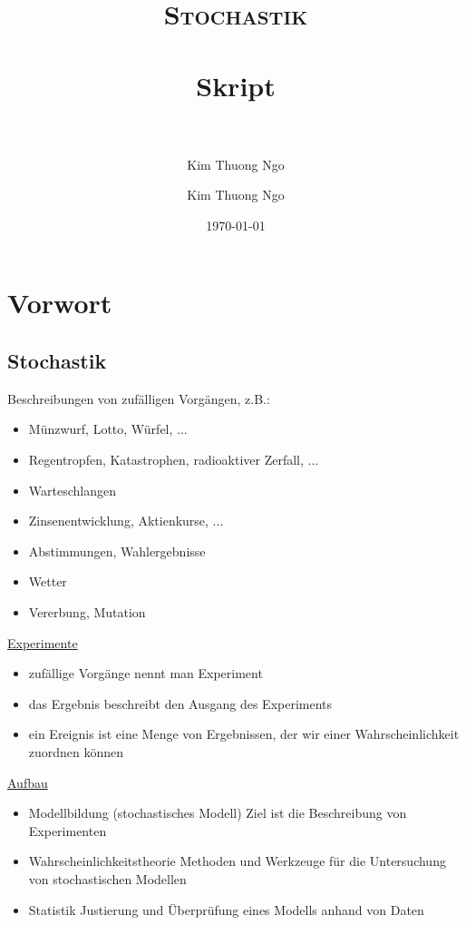 \documentclass[paper=a4, fontsize=11pt]{scrartcl}
\author{Kim Thuong Ngo}
\title{	
\normalfont \normalsize 
\textsc{Stochastik} \\ [25pt] 
\horrule{0.5pt} \\[0.4cm] 
\huge Skript \\ 
\horrule{2pt} \\[0.5cm] 
}
\author{Kim Thuong Ngo}
\date{\normalsize\today}
\numberwithin{equation}{section}
\numberwithin{figure}{section}
\numberwithin{table}{section}
\begin{document}
\maketitle 

\newpage

\tableofcontents

\newpage


\section{Vorwort}

\subsection{Stochastik}

Beschreibungen von zufälligen Vorgängen, z.B.:

\begin{itemize}
\item Münzwurf, Lotto, Würfel, ...
\item Regentropfen, Katastrophen, radioaktiver Zerfall, ...
\item Warteschlangen
\item Zinsenentwicklung, Aktienkurse, ...
\item Abstimmungen, Wahlergebnisse
\item Wetter
\item Vererbung, Mutation
\end{itemize}

\underline{Experimente}

\begin{itemize}
\item zufällige Vorgänge nennt man Experiment
\item das Ergebnis beschreibt den Ausgang des Experiments
\item ein Ereignis ist eine Menge von Ergebnissen, der wir einer Wahrscheinlichkeit zuordnen können
\end{itemize}

\underline{Aufbau}

\begin{itemize}
\item Modellbildung (stochastisches Modell)
Ziel ist die Beschreibung von Experimenten
\item Wahrscheinlichkeitstheorie
Methoden und Werkzeuge für die Untersuchung von stochastischen Modellen
\item Statistik
Justierung und Überprüfung eines Modells anhand von Daten
\end{itemize}
\end{document}
